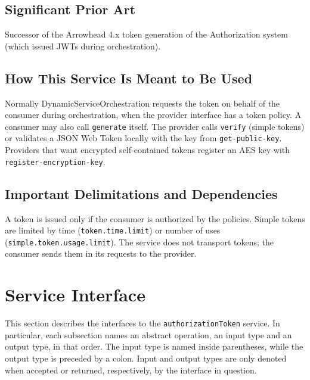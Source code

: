 \documentclass[a4paper]{arrowhead}
\begin{document}
\subsection{Significant Prior Art}

Successor of the Arrowhead 4.x token generation of the Authorization system (which issued JWTs during orchestration).

\subsection{How This Service Is Meant to Be Used}

Normally Dynamic\allowbreak{}Service\allowbreak{}Orchestration requests the token on behalf of the consumer during orchestration, when the provider interface has a token policy. A consumer may also call \texttt{generate} itself. The provider calls \texttt{verify} (simple tokens) or validates a JSON Web Token locally with the key from \texttt{get-\allowbreak{}public-\allowbreak{}key}. Providers that want encrypted self-contained tokens register an AES key with \texttt{register-\allowbreak{}encryption-\allowbreak{}key}.

\subsection{Important Delimitations and Dependencies}
\label{sec:delimitations}

A token is issued only if the consumer is authorized by the policies. Simple tokens are limited by time (\texttt{token.\allowbreak{}time.\allowbreak{}limit}) or number of uses (\texttt{simple.\allowbreak{}token.\allowbreak{}usage.\allowbreak{}limit}). The service does not transport tokens; the consumer sends them in its requests to the provider.

\newpage

\section{Service Interface}
\label{sec:operations}

This section describes the interfaces to the \texttt{authorizationToken} service.
In particular, each subsection names an abstract operation, an input type and an output type, in that order.
The input type is named inside parentheses, while the output type is preceded by a colon.
Input and output types are only denoted when accepted or returned, respectively, by the interface in question.
\end{document}
